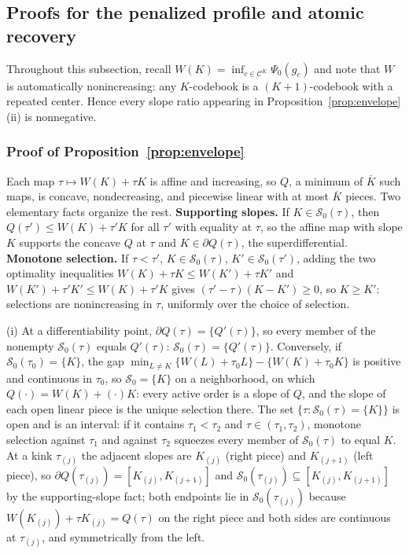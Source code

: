 \documentclass[11pt]{article}
\newcommand{\calC}{\mathcal C}
\newcommand{\calS}{\mathcal S}
\begin{document}
\subsection{Proofs for the penalized profile and atomic recovery}\label{app:penalized}

Throughout this subsection, recall $W(K)=\inf_{c\in\calC^K}\Psi_0(g_c)$ and note that $W$ is automatically nonincreasing: any $K$-codebook is a $(K+1)$-codebook with a repeated center. Hence every slope ratio appearing in Proposition~\ref{prop:envelope}(ii) is nonnegative.

\subsubsection{Proof of Proposition~\ref{prop:envelope}}
Each map $\tau\mapsto W(K)+\tau K$ is affine and increasing, so $Q$, a minimum of $\overline K$ such maps, is concave, nondecreasing, and piecewise linear with at most $\overline K$ pieces. Two elementary facts organize the rest. \textbf{Supporting slopes.} If $K\in\calS_0(\tau)$, then $Q(\tau')\le W(K)+\tau'K$ for all $\tau'$ with equality at $\tau$, so the affine map with slope $K$ supports the concave $Q$ at $\tau$ and $K\in\partial Q(\tau)$, the superdifferential. \textbf{Monotone selection.} If $\tau<\tau'$, $K\in\calS_0(\tau)$, $K'\in\calS_0(\tau')$, adding the two optimality inequalities $W(K)+\tau K\le W(K')+\tau K'$ and $W(K')+\tau'K'\le W(K)+\tau'K$ gives $(\tau'-\tau)(K-K')\ge0$, so $K\ge K'$: selections are nonincreasing in $\tau$, uniformly over the choice of selection.

(i) At a differentiability point, $\partial Q(\tau)=\{Q'(\tau)\}$, so every member of the nonempty $\calS_0(\tau)$ equals $Q'(\tau)$: $\calS_0(\tau)=\{Q'(\tau)\}$. Conversely, if $\calS_0(\tau_0)=\{K\}$, the gap $\min_{L\ne K}\{W(L)+\tau_0L\}-\{W(K)+\tau_0K\}$ is positive and continuous in $\tau_0$, so $\calS_0=\{K\}$ on a neighborhood, on which $Q(\cdot)=W(K)+(\cdot)K$: every active order is a slope of $Q$, and the slope of each open linear piece is the unique selection there. The set $\{\tau:\calS_0(\tau)=\{K\}\}$ is open and is an interval: if it contains $\tau_1<\tau_2$ and $\tau\in(\tau_1,\tau_2)$, monotone selection against $\tau_1$ and against $\tau_2$ squeezes every member of $\calS_0(\tau)$ to equal $K$. At a kink $\tau_{(j)}$ the adjacent slopes are $K_{(j)}$ (right piece) and $K_{(j+1)}$ (left piece), so $\partial Q(\tau_{(j)})=[K_{(j)},K_{(j+1)}]$ and $\calS_0(\tau_{(j)})\subseteq[K_{(j)},K_{(j+1)}]$ by the supporting-slope fact; both endpoints lie in $\calS_0(\tau_{(j)})$ because $W(K_{(j)})+\tau K_{(j)}=Q(\tau)$ on the right piece and both sides are continuous at $\tau_{(j)}$, and symmetrically from the left.
\end{document}
